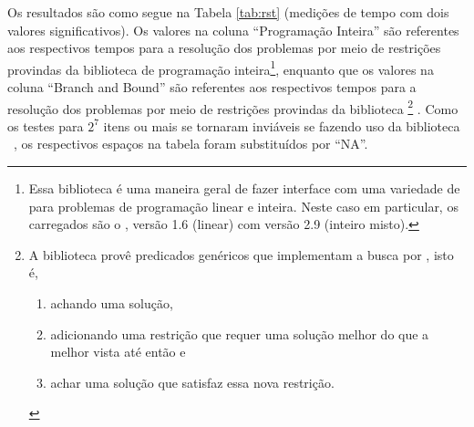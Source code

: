 \documentclass{article}
\begin{document}
Os resultados são como segue na Tabela \ref{tab:rst} (medições de tempo com
dois valores significativos). Os valores na coluna ``Programação
Inteira'' são referentes aos respectivos tempos para a resolução dos
problemas por meio de restrições provindas da biblioteca
 de programação inteira\footnote{Essa biblioteca
  \eclipse é uma maneira geral de fazer interface com uma variedade de
   para problemas de programação linear e
  inteira. Neste caso em particular, os  carregados
  são o , versão 1.6 (linear) com
   versão 2.9 (inteiro misto)\cite{coin}.}, enquanto
que os valores na
coluna ``Branch and Bound'' são referentes aos respectivos tempos para
a resolução dos problemas por meio de restrições provindas da
biblioteca \footnote{A biblioteca
  \eclipse {} provê predicados genéricos
  que implementam a busca por , isto é,
  \begin{enumerate}
  \item achando uma solução,
  \item adicionando uma restrição que requer uma solução melhor do
    que a melhor vista até então e
  \item achar uma solução que satisfaz essa nova restrição.
  \end{enumerate}} . Como os
  testes para $2^7$ itens ou mais se tornaram inviáveis se fazendo uso
  da biblioteca \eclipse\ , os
  respectivos espaços na tabela foram substituídos por ``NA''.
\end{document}
